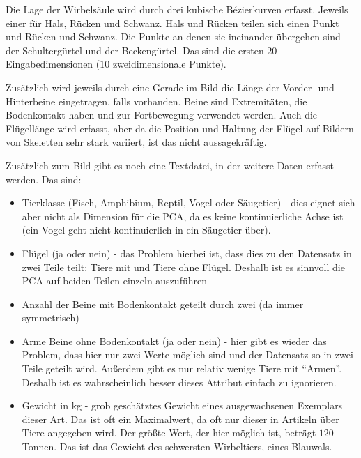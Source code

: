  Die Lage der Wirbelsäule wird durch drei kubische Bézierkurven erfasst. Jeweils einer für Hals, Rücken und Schwanz. Hals und Rücken teilen sich einen Punkt und Rücken und Schwanz. Die Punkte an denen sie ineinander übergehen sind der Schultergürtel und der Beckengürtel.
 Das sind die ersten $20$ Eingabedimensionen ($10$ zweidimensionale Punkte).
 
 Zusätzlich wird jeweils durch eine Gerade im Bild die Länge der Vorder- und Hinterbeine eingetragen, falls vorhanden. Beine sind Extremitäten, die Bodenkontakt haben und zur Fortbewegung verwendet werden.  Auch die Flügellänge wird erfasst, aber da die Position und Haltung der Flügel auf Bildern von Skeletten sehr stark variiert, ist das nicht aussagekräftig.
 
 Zusätzlich zum Bild gibt es noch eine Textdatei, in der weitere Daten erfasst werden. Das sind:
 \begin{itemize}
  \item Tierklasse (Fisch, Amphibium, Reptil, Vogel oder Säugetier) - dies eignet sich aber nicht als Dimension für die PCA, da es keine kontinuierliche Achse ist (ein Vogel geht \zb nicht kontinuierlich in ein Säugetier über).
  
  \item Flügel (ja oder nein) - das Problem hierbei ist, dass dies zu den Datensatz in zwei Teile teilt: Tiere mit und Tiere ohne Flügel. Deshalb ist es sinnvoll die PCA auf beiden Teilen einzeln auszuführen 
  
  \item Anzahl der Beine mit Bodenkontakt geteilt durch zwei (da immer symmetrisch)
  
  \item Arme \bzw Beine ohne Bodenkontakt (ja oder nein) - hier gibt es wieder das Problem, dass hier nur zwei Werte möglich sind und der Datensatz so in zwei Teile geteilt wird. Außerdem gibt es nur relativ wenige Tiere mit "`Armen"'. Deshalb ist es wahrscheinlich besser dieses Attribut einfach zu ignorieren.
  
  \item Gewicht in kg - grob geschätztes Gewicht eines ausgewachsenen Exemplars dieser Art. Das ist oft ein Maximalwert, da oft nur dieser in Artikeln über Tiere angegeben wird. Der größte Wert, der hier möglich ist, beträgt $120$ Tonnen. Das ist das Gewicht des schwersten Wirbeltiers, eines Blauwals.
 \end{itemize}

